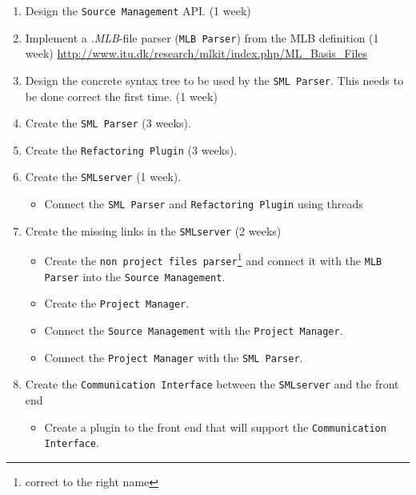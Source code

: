 \documentclass[a4paper,oneside]{memoir}
\begin{document}
\begin{enumerate}
\item Design the \texttt{Source Management} API. (1 week)

\item Implement a \textit{.MLB}-file parser (\texttt{MLB Parser}) from the MLB
  definition (1 week)
\url{http://www.itu.dk/research/mlkit/index.php/ML_Basis_Files}

\item Design the concrete syntax tree to be used by the \texttt{SML
    Parser}. This needs to be done correct the first time. (1 week)

\item Create the \texttt{SML Parser} (3 weeks).

\item Create the \texttt{Refactoring Plugin} (3 weeks).

\item Create the \texttt{SMLserver} (1 week).
  \begin{itemize}
  \item Connect the \texttt{SML Parser} and \texttt{Refactoring
      Plugin} using threads
  \end{itemize}

\item Create the missing links in the \texttt{SMLserver} (2 weeks)
  \begin{itemize}
  \item Create the \texttt{non project files parser}\footnote{correct to the
      right name} and connect it with the \texttt{MLB Parser} into the
    \texttt{Source Management}.

  \item Create the \texttt{Project Manager}.

  \item Connect the \texttt{Source Management} with the \texttt{Project
      Manager}.

  \item Connect the \texttt{Project Manager} with the \texttt{SML Parser}.
  \end{itemize}

\item Create the \texttt{Communication Interface} between the
  \texttt{SMLserver} and the front end
  \begin{itemize}
  \item Create a plugin to the front end that will support the
    \texttt{Communication Interface}.
  \end{itemize}
\end{enumerate}
\end{document}
